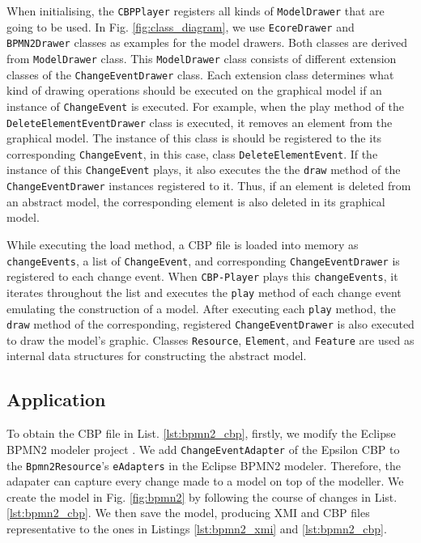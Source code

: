 \documentclass[conference]{IEEEtran}
\begin{document}
When initialising, the \texttt{CBPPlayer} registers all kinds of \texttt{ModelDrawer} that are going to be used. 
In Fig. \ref{fig:class_diagram}, we use \texttt{EcoreDrawer} and \texttt{BPMN2Drawer} classes as examples for the model drawers. 
Both classes are derived from \texttt{ModelDrawer} class. This \texttt{ModelDrawer} class consists of 
different extension classes of the \texttt{ChangeEventDrawer} class. Each extension class determines
what kind of drawing operations should be executed on the graphical model if an instance of \texttt{ChangeEvent} is executed.
For example, when the play method of the \texttt{DeleteElementEventDrawer} class is executed,
it removes an element from the graphical model. The instance of this class is should be registered to
the its corresponding \texttt{ChangeEvent}, in this case, class \texttt{DeleteElementEvent}. 
If the instance of this \texttt{ChangeEvent} plays, it also executes the the \texttt{draw} method of 
the \texttt{ChangeEventDrawer} instances registered to it. Thus, if an element is deleted from an abstract model,
the corresponding element is also deleted in its graphical model. 

While executing the load method, a CBP file is loaded into memory as \texttt{changeEvents}, 
a list of \texttt{ChangeEvent}, and corresponding \texttt{ChangeEventDrawer} is registered to each change event. 
When \texttt{CBP-Player} plays this \texttt{changeEvents}, it iterates throughout the list and executes  
the \texttt{play} method of each change event emulating the construction of a model. 
After executing each \texttt{play} method, the \texttt{draw} method of 
the corresponding, registered \texttt{ChangeEventDrawer} is also executed to draw the model's graphic.
Classes \texttt{Resource}, \texttt{Element}, and \texttt{Feature} are used as internal data structures 
for constructing the abstract model.

\subsection{Application}
\label{sec:application}
To obtain the CBP file in List. \ref{lst:bpmn2_cbp}, firstly, we modify
the Eclipse BPMN2 modeler project \cite{eclipse2019bpmn2}. We add \texttt{ChangeEventAdapter} \cite{epsilonlabs2019changeeventadapter}
of the Epsilon CBP \cite{DBLP:conf/models/YohannisKP17}  to the \texttt{Bpmn2Resource}'s \texttt{eAdapters}
in the Eclipse BPMN2 modeler. Therefore, the adapater can capture every change made to a model on top of the modeller.
We create the model in Fig. \ref{fig:bpmn2} by following the course of changes in List. \ref{lst:bpmn2_cbp}.
We then save the model, producing XMI and CBP files representative to the ones 
in Listings \ref{lst:bpmn2_xmi} and \ref{lst:bpmn2_cbp}. 
 
\end{document}
